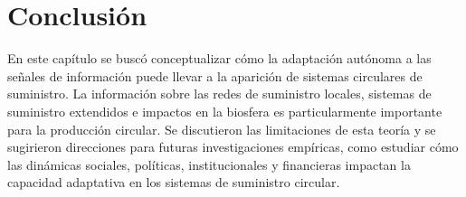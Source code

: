 \documentclass[runningheads]{llncs}
\begin{document}
\hypertarget{conclusiuxf3n}{%
\section{Conclusión}\label{conclusiuxf3n}}

En este capítulo se buscó conceptualizar cómo la adaptación autónoma a
las señales de información puede llevar a la aparición de sistemas
circulares de suministro. La información sobre las redes de suministro
locales, sistemas de suministro extendidos e impactos en la biosfera es
particularmente importante para la producción circular. Se discutieron
las limitaciones de esta teoría y se sugirieron direcciones para futuras
investigaciones empíricas, como estudiar cómo las dinámicas sociales,
políticas, institucionales y financieras impactan la capacidad
adaptativa en los sistemas de suministro circular.

%
\end{document}
